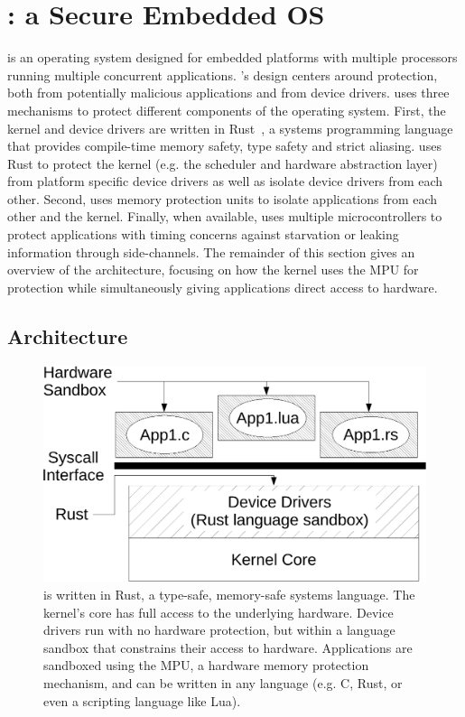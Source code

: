 \section{\name: a Secure Embedded OS}
\label{sec:os}

\name is an operating system  designed for embedded platforms
with multiple processors running multiple concurrent applications.
\name's design centers around protection, both from potentially
malicious applications and from device drivers. \name uses three
mechanisms to protect different components of the operating
system. First, the kernel and device drivers are written in Rust~\cite{rust}, 
a systems programming language that provides compile-time memory safety, 
type safety and
strict aliasing. \name uses Rust to protect the kernel (e.g. the
scheduler and hardware abstraction layer) from platform specific
device drivers as well as isolate device drivers from each other. 
Second, \name uses memory protection units
 to isolate applications from each other and
the kernel. Finally, when available, \name uses multiple microcontrollers to
protect applications with timing concerns against starvation or leaking
information through side-channels. The remainder of this section gives an
overview of the \name architecture, focusing on how the kernel uses the
MPU for protection while simultaneously giving applications direct access
to hardware.

\subsection{Architecture}
\label{sec:os-arch}

\begin{figure}
 \centering
\includegraphics[width=1\columnwidth]{img/architecture-crop}
\caption{\name is written in Rust, a type-safe, memory-safe systems language.
The \name kernel's core has full access to the underlying hardware. Device
drivers run with no hardware protection, but within a language sandbox that
constrains their access to hardware. Applications are sandboxed using the MPU, a
hardware memory protection mechanism, and can be written in any language (e.g.
C, Rust, or even a scripting language like Lua).}
\label{fig:architecture}
\end{figure}

